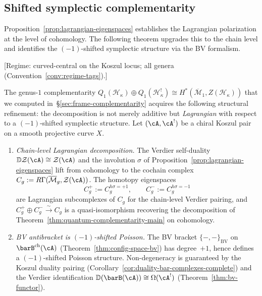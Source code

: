 \subsection{Shifted symplectic complementarity}
\label{sec:shifted-symplectic-complementarity}

Proposition~\ref{prop:lagrangian-eigenspaces} establishes the
Lagrangian polarization at the level of cohomology.  The following
theorem upgrades this to the chain level and identifies the
$(-1)$-shifted symplectic structure via the BV formalism.

\begin{theorem}
\label{thm:shifted-symplectic-complementarity}
\textup{[Regime: curved-central on the Koszul locus; all genera
\textup{(}Convention~\textup{\ref{conv:regime-tags})}.]}

The genus-$1$ complementarity $Q_1(\mathcal{H}_\kappa) \oplus Q_1(\mathcal{H}_\kappa^!) \cong H^*(\overline{\mathcal{M}}_1, Z(\mathcal{H}_\kappa))$ that we computed in~\S\ref{sec:frame-complementarity} acquires the following structural refinement: the decomposition is not merely additive but \emph{Lagrangian} with respect to a $(-1)$-shifted symplectic structure.
Let $(\cA, \cA^!)$ be a chiral Koszul pair on a smooth projective
curve $X$.
\begin{enumerate}[label=\textup{(\roman*)}]
\item \emph{Chain-level Lagrangian decomposition.}
  The Verdier self-duality
  $\mathbb{D}\mathcal{Z}(\cA) \cong \mathcal{Z}(\cA)$ and
  the involution $\sigma$ of
  Proposition~\textup{\ref{prop:lagrangian-eigenspaces}}
  lift from cohomology to the cochain complex
  $C_g := R\Gamma(\overline{\mathcal{M}}_g, \mathcal{Z}(\cA))$.
  The homotopy eigenspaces
  \[
  C_g^+ := C_g^{h\sigma = +1}, \qquad
  C_g^- := C_g^{h\sigma = -1}
  \]
  are Lagrangian subcomplexes of $C_g$ for the chain-level
  Verdier pairing, and $C_g^+ \oplus C_g^- \xrightarrow{\sim} C_g$
  is a quasi-isomorphism recovering the decomposition of
  Theorem~\textup{\ref{thm:quantum-complementarity-main}} on cohomology.

\item \emph{BV antibracket is $(-1)$-shifted Poisson.}
  The BV bracket $\{-,-\}_{\mathrm{BV}}$ on
  $\barB^{\mathrm{ch}}(\cA)$
  \textup{(}Theorem~\textup{\ref{thm:config-space-bv}}\textup{)}
  has degree~$+1$, hence defines a $(-1)$-shifted Poisson structure.
  Non-degeneracy is guaranteed by the Koszul duality pairing
  \textup{(}Corollary~\textup{\ref{cor:duality-bar-complexes-complete}}\textup{)}
  and the Verdier identification
  $\mathbb{D}(\barB(\cA)) \cong \Omega(\cA^!)$
  \textup{(}Theorem~\textup{\ref{thm:bv-functor}}\textup{)}.


\end{enumerate}
\end{theorem}
